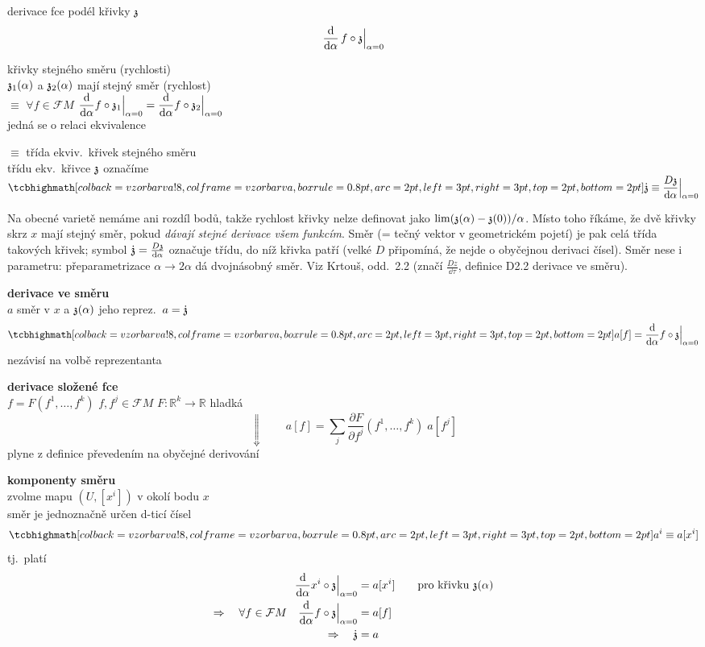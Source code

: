 derivace fce podél křivky $\mathfrak{z}$
\[
  \frac{\dd}{\dd\alpha}\, f\circ\mathfrak{z}\Big|_{\alpha=0}
\]

křivky stejného směru (rychlosti) \\
\quad $\mathfrak{z}_1(\alpha)$ a $\mathfrak{z}_2(\alpha)$ mají stejný směr (rychlost) \\
\quad $\equiv$ \quad $\forall f\in\mathcal{F}M$ \quad
$\dfrac{\dd}{\dd\alpha}f\circ\mathfrak{z}_1\Big|_{\alpha=0} = \dfrac{\dd}{\dd\alpha}f\circ\mathfrak{z}_2\Big|_{\alpha=0}$ \\
\quad jedná se o relaci ekvivalence

\begin{definice}
 $\equiv$ třída ekviv.\ křivek stejného směru \\
třídu ekv.\ křivce $\mathfrak{z}$ označíme \quad
$\vzorec{\dot\gmItrikr \equiv \dfrac{D\gmItrikr}{\dd\alpha}\Big|_{\alpha=0}}$
\end{definice}

\begin{vysvetleni}
Na obecné varietě nemáme  ani rozdíl bodů, takže rychlost křivky nelze definovat jako $\lim(\mathfrak{z}(\alpha)-\mathfrak{z}(0))/\alpha$. Místo toho říkáme, že dvě křivky skrz $x$ mají stejný směr, pokud \emph{dávají stejné derivace všem funkcím}. Směr (= tečný vektor v geometrickém pojetí) je pak celá třída takových křivek; symbol $\dot{\mathfrak{z}} = \frac{D\mathfrak{z}}{\dd\alpha}$ označuje třídu, do níž křivka patří (velké $D$ připomíná, že nejde o obyčejnou derivaci čísel). Směr nese i  parametru: přeparametrizace $\alpha\to2\alpha$ dá dvojnásobný směr. Viz Krtouš, odd.~2.2 (značí $\frac{D z}{\dd\tau}$, definice D2.2 derivace ve směru).
\end{vysvetleni}

\textbf{derivace ve směru} \\
\quad $a$ směr v $x$ a $\mathfrak{z}(\alpha)$ jeho reprez.\ $a = \dot{\mathfrak{z}}$
\[
  \vzorec{a[f] = \frac{\dd}{\dd\alpha}f\circ\gmItrikr\Big|_{\alpha=0}}
\]
\quad nezávisí na volbě reprezentanta

\textbf{derivace složené fce} \\
\quad $f = F(f^1,\dots,f^k)$ \qquad $f, f^j\in\mathcal{F}M$ \qquad $F:\mathbb{R}^k\to\mathbb{R}$ hladká
\[
  \Downarrow\qquad a[f] = \sum_j \frac{\partial F}{\partial f^j}(f^1,\dots,f^k)\; a[f^j]
\]
\quad plyne z definice převedením na obyčejné derivování

\textbf{komponenty směru} \\
\quad zvolme mapu $(U,[x^i])$ v okolí bodu $x$ \\
\quad směr je jednoznačně určen d-ticí čísel
\[
  \vzorec{a^i \equiv a[x^i]}
\]
\quad tj.\ platí
\begin{align*}
  \frac{\dd}{\dd\alpha}x^i\circ\mathfrak{z}\Big|_{\alpha=0} &= a[x^i] \qquad\text{pro křivku } \mathfrak{z}(\alpha) \\
  \Rightarrow\quad \forall f\in\mathcal{F}M \quad \frac{\dd}{\dd\alpha}f\circ\mathfrak{z}\Big|_{\alpha=0} &= a[f] \\
  \Rightarrow\quad \dot{\mathfrak{z}} &= a
\end{align*}

